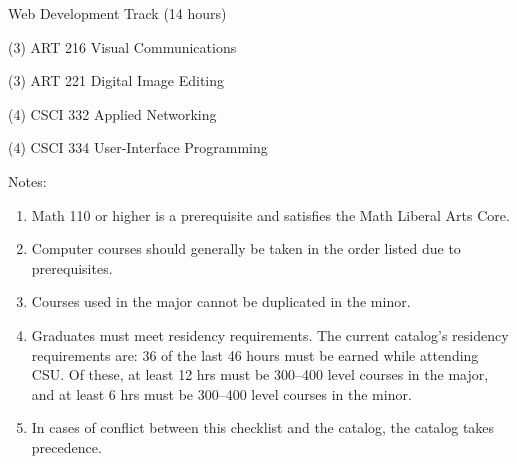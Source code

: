 \begin{reqgroup}{Web Development Track (14 hours)}
\begin{checklist}
	\item (3) ART 216 Visual Communications
	\item (3) ART 221 Digital Image Editing
	\item (4) CSCI 332 Applied Networking
	\item (4) CSCI 334 User-Interface Programming
\end{checklist}
\end{reqgroup}

Notes:%
\begin{enumerate}\footnotesize
	\item Math 110 or higher is a prerequisite and satisfies the Math Liberal Arts Core.
	\item Computer courses should generally be taken in the order listed due to prerequisites.
	\item Courses used in the major cannot be duplicated in the minor.
	\item Graduates must meet residency requirements. The current catalog’s residency requirements are: 36 of the last 46 hours must be earned while attending CSU. Of these, at least 12 hrs must be 300--400 level courses in the major, and at least 6 hrs must be 300--400 level courses in the minor.
	\item In cases of conflict between this checklist and the catalog, the catalog takes precedence.
\end{enumerate}